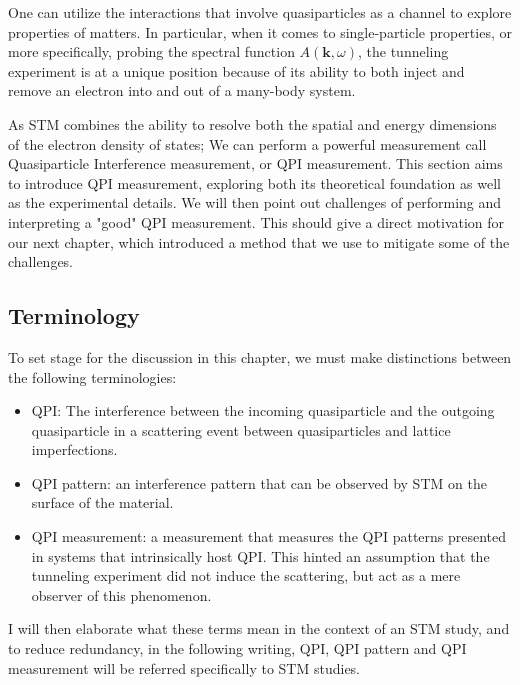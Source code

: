 One can utilize the interactions that involve quasiparticles as a channel to explore properties of matters. In particular, when it comes to single-particle properties, or more specifically, probing the spectral function $A(\textbf{k},\omega)$, the tunneling experiment is at a unique position because of its ability to both inject and remove an electron into and out of a many-body system.  

As \ac{STM} combines the ability to resolve both the spatial and energy dimensions of the electron density of states; We can perform a powerful measurement call Quasiparticle Interference measurement, or \ac{QPI} measurement. This section aims to introduce \ac{QPI} measurement, exploring both its theoretical foundation as well as the experimental details. We will then point out challenges of performing and interpreting a "good" \ac{QPI} measurement. This should give a direct motivation for our next chapter, which introduced a method that we use to mitigate some of the challenges. 

\subsection{Terminology}
To set stage for the discussion in this chapter, we must make distinctions between the following terminologies: 
\begin{itemize}
	\item QPI: The interference between the incoming quasiparticle and the outgoing quasiparticle in a scattering event between quasiparticles and lattice imperfections.  
	\item QPI pattern: an interference pattern that can be observed by \ac{STM} on the surface of the material.
	\item QPI measurement: a measurement that measures the QPI patterns presented in systems that intrinsically host QPI. This hinted an assumption that the tunneling experiment did not induce the scattering, but act as a mere observer of this phenomenon.
\end{itemize}
I will then elaborate what these terms mean in the context of an STM study, and to reduce redundancy, in the following writing, QPI, QPI pattern and QPI measurement will be referred specifically to STM studies.

